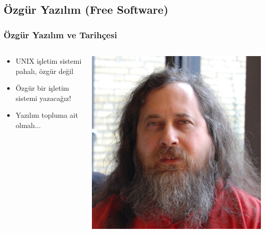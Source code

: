 \documentclass{beamer}
\begin{document}
	\subsection{Özgür Yazılım (Free Software)}
		\begin{frame}
			\frametitle{Özgür Yazılım ve Tarihçesi}
			\begin{columns}
			\begin{column}[l]{5cm}
				\begin{itemize}
				\item UNIX işletim sistemi pahalı, özgür değil
				\item Özgür bir işletim sistemi yazacağız!
				\item Yazılım topluma ait olmalı...
				\end{itemize}
			\end{column}
			\begin{column}[r]{5cm}
			\includegraphics{richard}
			\end{column}
			\end{columns}
			
		\end{frame}
		
\end{document}
